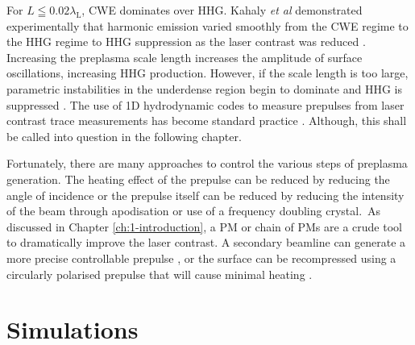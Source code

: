 For $L \leqq 0.02 \lambda_\mathrm{L}$, \ac{CWE} dominates over HHG. Kahaly \textit{et al} demonstrated experimentally that harmonic emission varied smoothly from the CWE regime to the HHG regime to HHG suppression as the laser contrast was reduced  \cite{kahalyDirectObservationDensityGradient2013}. Increasing the preplasma scale length increases the amplitude of surface oscillations, increasing HHG production. However, if the scale length is too large, parametric instabilities in the underdense region begin to dominate and HHG is suppressed \cite{dollarScalingHighorderHarmonic2013}. The use of 1D hydrodynamic codes to measure prepulses from laser contrast trace measurements has become standard practice \cite{behmkeControllingSpacingAttosecond2011, dollarScalingHighorderHarmonic2013, liExperimentalDemonstrationEfficient2022}. Although, this shall be called into question in the following chapter.

Fortunately, there are many approaches to control the various steps of preplasma generation. The heating effect of the prepulse can be reduced by reducing the angle of incidence or the prepulse itself can be reduced by reducing the intensity of the beam through apodisation or use of a frequency doubling crystal. As discussed in Chapter \ref{ch:1-introduction}, a PM or chain of PMs are a crude tool to dramatically improve the laser contrast. A secondary beamline can generate a more precise controllable prepulse \cite{kahalyDirectObservationDensityGradient2013}, or the surface can be recompressed using a circularly polarised prepulse that will cause minimal heating \cite{liExperimentalDemonstrationEfficient2022}.

\section{\label{ch:3-sec:simulations}Simulations}
